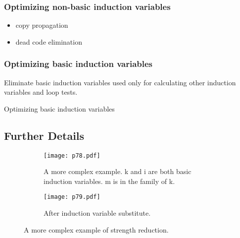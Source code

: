 \subsubsection{Optimizing non-basic induction variables}


\begin{itemize}
	\item copy propagation
	\item dead code elimination
\end{itemize}


\subsubsection{Optimizing basic induction variables}

Eliminate basic induction variables used only for calculating other induction variables and loop tests.
\begin{algorithm}[H]
	\caption{Optimizing basic induction variables}\label{alg:Optimizing basic induction variables}
	\begin{algorithmic}


	\end{algorithmic}
\end{algorithm}

\subsection{Further Details}


\begin{figure}[H]
	\centering
	\begin{subfigure}{0.7\textwidth}
		\centering
		\texttt{[image: p78.pdf]}
		\caption{A more complex example. k and i are both basic induction variables.
			m is in the family of k.}
		\label{fig:p78}
	\end{subfigure}
	\begin{subfigure}{\textwidth}
		\centering
		\texttt{[image: p79.pdf]}
		\caption{After induction variable substitute.}
		\label{fig:p79}
	\end{subfigure}

	\caption{A more complex example of strength reduction.}
	\label{fig:p74-76}
\end{figure}

